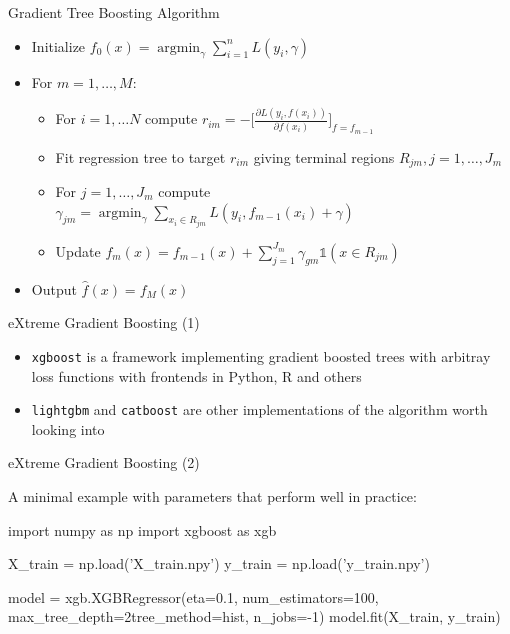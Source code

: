 \documentclass{beamer}
\DeclareMathOperator*{\argmin}{argmin}
\begin{document}
    \begin{frame}{Gradient Tree Boosting Algorithm}
        \begin{itemize}
            \item[1.] Initialize $f_0(x) = \argmin_{\gamma} \sum_{i=1}^n L(y_i, \gamma)$ 
            \item[2.] For $m = 1, \ldots, M$:
            \begin{itemize}
                \item[(a)] For $i = 1, \ldots N$ compute $r_{im} = - \Bigg[ \frac{\partial L(y_i, f(x_i))}{\partial f(x_i)}  \Bigg]_{f = f_{m-1}}$
                \item[(b)] Fit regression tree to target $r_{im}$ giving terminal regions $R_{jm}, j = 1, \ldots, J_m$
                \item[(c)] For $j = 1, \ldots, J_m$ compute $\gamma_{jm} = \argmin_{\gamma} \sum_{x_i \in R_{jm}} L(y_i, f_{m-1}(x_i) + \gamma)$
                \item[(d)] Update $f_m(x) = f_{m-1}(x) + \sum_{j = 1}^{J_m}\gamma_{gm} \mathds{1}(x \in R_{jm}) $    
            \end{itemize}  
            \item[3.] Output $\hat{f} (x) = f_M(x)$
        \end{itemize}
    \end{frame}

    \begin{frame}{eXtreme Gradient Boosting (1)}
        \begin{itemize}
            \item \texttt{xgboost} is a framework implementing gradient boosted trees with arbitray loss functions with frontends in Python, R and others
            \item \texttt{lightgbm} and \texttt{catboost} are other implementations of the algorithm worth looking into
        \end{itemize}
    \end{frame}

    \begin{frame}[fragile]{eXtreme Gradient Boosting (2)}
    
    A minimal example with parameters that perform well in practice:

    \begin{python}
    import numpy as np
    import xgboost as xgb
        
    X_train = np.load('X_train.npy')
    y_train = np.load('y_train.npy')
        
    model = xgb.XGBRegressor(eta=0.1, num_estimators=100, max_tree_depth=2tree_method=hist, n_jobs=-1)
    model.fit(X_train, y_train) 
    \end{python}
    \end{frame}
\end{document}
